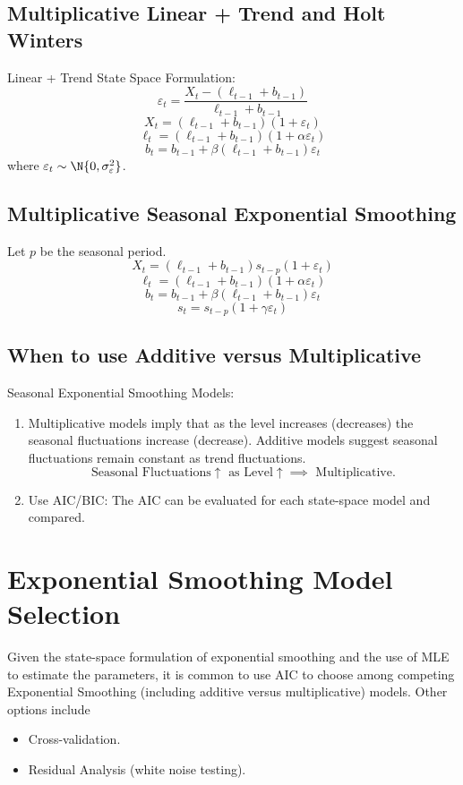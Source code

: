 \subsection*{Multiplicative Linear + Trend and Holt Winters}
Linear + Trend State Space Formulation:
\[ \varepsilon_t=\frac{X_t-(\ell_{t-1}+b_{t-1})}{\ell_{t-1}+b_{t-1}}  \]
\[ X_t=(\ell_{t-1}+b_{t-1})(1+\varepsilon_t) \]
\[ \ell_t=(\ell_{t-1}+b_{t-1})(1+\alpha\varepsilon_t) \]
\[ b_t=b_{t-1}+\beta(\ell_{t-1}+b_{t-1})\varepsilon_t \]
where $ \varepsilon_t \sim \N{0,\sigma_{\varepsilon}^2} $.
\subsection*{Multiplicative Seasonal Exponential Smoothing}
Let $ p $ be the seasonal period.
\[ X_t=(\ell_{t-1}+b_{t-1})s_{t-p}(1+\varepsilon_t) \]
\[ \ell_t=(\ell_{t-1}+b_{t-1})(1+\alpha\varepsilon_t) \]
\[ b_t=b_{t-1}+\beta(\ell_{t-1}+b_{t-1})\varepsilon_t \]
\[ s_t=s_{t-p}(1+\gamma\varepsilon_t) \]
\subsection*{When to use Additive versus Multiplicative}
Seasonal Exponential Smoothing Models:
\begin{enumerate}[(1)]
    \item Multiplicative models imply that as the level increases (decreases)
          the seasonal fluctuations increase (decrease). Additive models suggest
          seasonal fluctuations remain constant as trend fluctuations.
          \[ \text{Seasonal Fluctuations}\uparrow\text{ as }\text{Level}\uparrow\implies
              \text{ Multiplicative}. \]
    \item Use AIC/BIC\@: The AIC can be evaluated for each state-space
          model and compared.
\end{enumerate}
\section{Exponential Smoothing Model Selection}
Given the state-space formulation of exponential smoothing and the use of MLE to estimate
the parameters, it is common to use AIC to choose among competing
Exponential Smoothing (including additive versus multiplicative) models. Other
options include
\begin{itemize}
    \item Cross-validation.
    \item Residual Analysis (white noise testing).
\end{itemize}
